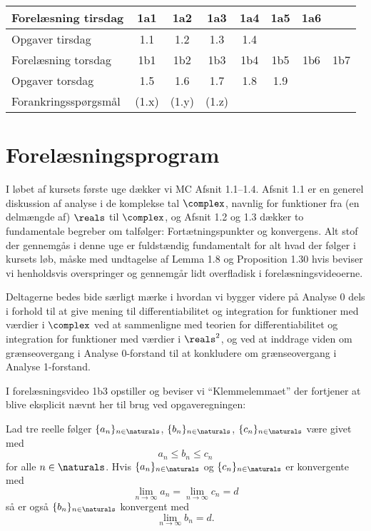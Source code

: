 \setcounter{section}{1}

\begin{center}
\begin{tabular}{|l||c|c|c|c|c|c|c|}\hline
Forel\ae{}sning tirsdag&1a1&1a2&1a3&1a4&1a5&1a6&\\\hline
Opgaver tirsdag&1.1&1.2&1.3&1.4&&&\\\hline
Forel\ae{}sning torsdag&1b1&1b2&1b3&1b4&1b5&1b6&1b7\\\hline
Opgaver torsdag&1.5&1.6&1.7&1.8&1.9&&\\\hline
Forankringssp\o{}rgsm\aa{}l&(1.x)&(1.y)&(1.z)&&&&\\\hline
\end{tabular}
\end{center}

\section*{Forel\ae{}sningsprogram}
I l\o{}bet af kursets f\o{}rste uge d\ae{}kker vi MC Afsnit 1.1--1.4. Afsnit 1.1 er en generel diskussion af analyse i de komplekse tal $\complex$, navnlig for funktioner fra (en delm\ae{}ngde af) $\reals$ til $\complex$, og Afsnit 1.2 og 1.3 d\ae{}kker to fundamentale begreber om talf\o{}lger: Fort\ae{}tningspunkter og konvergens. Alt stof der gennemg\aa{}s i denne uge er fuldst\ae{}ndig fundamentalt for alt hvad der f\o{}lger i kursets l\o{}b, m\aa{}ske med undtagelse af Lemma 1.8 og Proposition 1.30 hvis beviser vi henholdsvis overspringer og gennemg\aa{}r lidt overfladisk i forel\ae{}sningsvideoerne.

Deltagerne bedes bide s\ae{}rligt m\ae{}rke i hvordan vi bygger videre p\aa{} Analyse 0 dels i forhold til at give mening til differentiabilitet og integration for funktioner med v\ae{}rdier i $\complex$ ved at sammenligne med teorien for differentiabilitet og integration for funktioner med v\ae{}rdier i $\reals^2$, og ved at inddrage viden om gr\ae{}nseovergang i Analyse 0-forstand til at konkludere om 
gr\ae{}nseovergang i Analyse 1-forstand.

I forel\ae{}sningsvideo 1b3 opstiller og beviser vi ``Klemmelemmaet'' der fortjener at blive eksplicit n\ae{}vnt her til brug ved opgaveregningen:

 Lad tre reelle f\o{}lger $\{a_n\}_{n\in \naturals}$, $\{b_n\}_{n\in \naturals}$, $\{c_n\}_{n\in \naturals}$ v\ae{}re givet med
\[
a_n\leq b_n\leq c_n
\]
for alle $n\in\naturals$. Hvis $\{a_n\}_{n\in \naturals}$ og $\{c_n\}_{n\in \naturals}$ er konvergente med
\[
\lim_{n\to\infty}a_n=\lim_{n\to\infty}c_n=d
\]
s\aa{} er ogs\aa{} $\{b_n\}_{n\in \naturals}$ konvergent med 
\[
\lim_{n\to\infty}b_n=d.
\]


